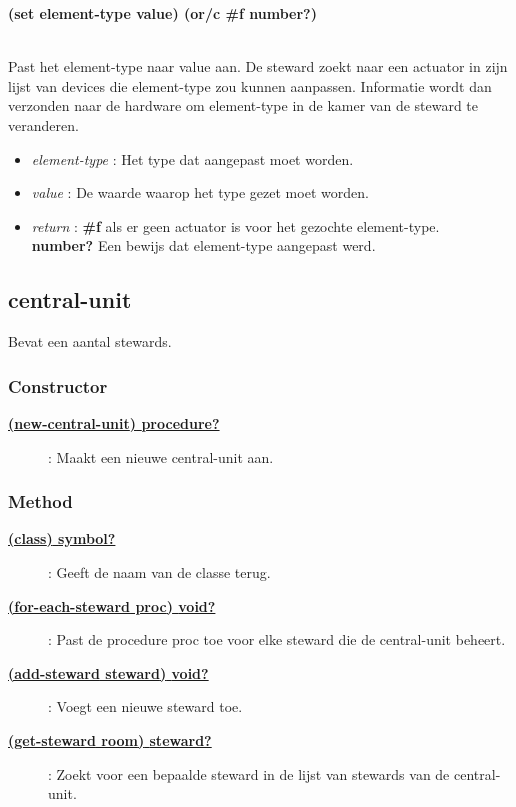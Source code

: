 \documentclass{article}
\newcommand{\ar}{\ding{213} }
\newcommand{\code}[1]{\textcolor{code}{#1}}
\newcommand{\lb}[1][]{\code{(#1}}
\newcommand{\rb}{\code{)}}
\newcommand{\racket}[1]{
	{\color{blue}\textbf{#1}}
}
\begin{document}
\begin{framed}
\hypertarget{steward:set}{\racket{\lb[set] element-type value\rb \ar \lb[or/c] \#f number?\rb}}
\\Past het element-type naar value aan. De steward zoekt naar een actuator in zijn lijst van devices die element-type zou kunnen aanpassen. Informatie wordt dan verzonden naar de hardware om element-type in de kamer van de steward te veranderen.
\begin{itemize}
	\item \emph{element-type} : Het type dat aangepast moet worden.
	\item \emph{value} : De waarde waarop het type gezet moet worden.
	\item \emph{return} : \racket{\#f} als er geen actuator is voor het gezochte element-type.\\\racket{number?} Een bewijs dat element-type aangepast werd.
\end{itemize}
\end{framed}

\newpage
\hypertarget{central-unit}{\subsection{central-unit}}
Bevat een aantal stewards.

\subsubsection{Constructor}
\begin{description}
	\item[\hyperlink{central-unit:new-central-unit}{\racket{\lb[new-central-unit]\rb \ar \code{procedure?}}}] : Maakt een nieuwe central-unit aan.
\end{description}

\subsubsection{Method}
\begin{description}
	\item[\hyperlink{central-unit:class}{\racket{\lb[class]\rb \ar \code{symbol?}}}] : Geeft de naam van de classe terug.
	\item[\hyperlink{central-unit:for-each-steward}{\racket{\lb[for-each-steward] proc\rb \ar \code{void?}}}] : Past de procedure proc toe voor elke steward die de central-unit beheert.
	\item[\hyperlink{central-unit:add-steward}{\racket{\lb[add-steward] steward\rb \ar \code{void?}}}] : Voegt een nieuwe steward toe.
	\item[\hyperlink{central-unit:get-steward}{\racket{\lb[get-steward] room\rb \ar \code{steward?}}}] : Zoekt voor een bepaalde steward in de lijst van stewards van de central-unit.
\end{description}
\end{document}
